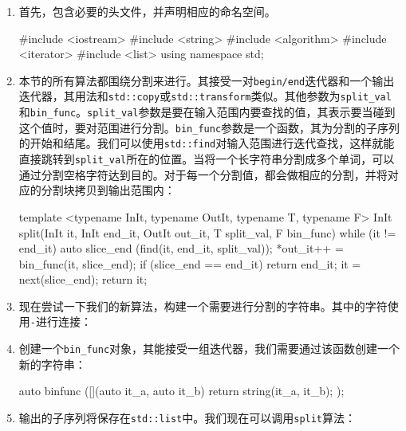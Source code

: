 \begin{enumerate}
\item 首先，包含必要的头文件，并声明相应的命名空间。

\begin{codebox}[cpp]
#include <iostream>
#include <string>
#include <algorithm>
#include <iterator>
#include <list>
using namespace std; 
\end{codebox}

\item 本节的所有算法都围绕分割来进行。其接受一对\texttt{begin/end}迭代器和一个输出迭代器，其用法和\texttt{std::copy}或\texttt{std::transform}类似。其他参数为\texttt{split\_val}和\texttt{bin\_func}。\texttt{split\_val}参数是要在输入范围内要查找的值，其表示要当碰到这个值时，要对范围进行分割。\texttt{bin\_func}参数是一个函数，其为分割的子序列的开始和结尾。我们可以使用\texttt{std::find}对输入范围进行迭代查找，这样就能直接跳转到\texttt{split\_val}所在的位置。当将一个长字符串分割成多个单词，可以通过分割空格字符达到目的。对于每一个分割值，都会做相应的分割，并将对应的分割块拷贝到输出范围内：

\begin{codebox}[cpp]
template <typename InIt, typename OutIt, typename T, typename F>
InIt split(InIt it, InIt end_it, OutIt out_it, T split_val,
          F bin_func)
{
    while (it != end_it) {
        auto slice_end (find(it, end_it, split_val));
        *out_it++ = bin_func(it, slice_end);
        if (slice_end == end_it) { return end_it; }
        it = next(slice_end);
    }
    return it;
}
\end{codebox}

\item 现在尝试一下我们的新算法，构建一个需要进行分割的字符串。其中的字符使用\texttt{-}进行连接：

\begin{codebox}[cpp]
int main()
{
    const string s {"a-b-c-d-e-f-g"};
\end{codebox}

\item 创建一个\texttt{bin\_func}对象，其能接受一组迭代器，我们需要通过该函数创建一个新的字符串：

\begin{codebox}[cpp]
    auto binfunc ([](auto it_a, auto it_b) {
        return string(it_a, it_b);
    });
\end{codebox}

\item 输出的子序列将保存在\texttt{std::list}中。我们现在可以调用\texttt{split}算法：


\end{enumerate}
